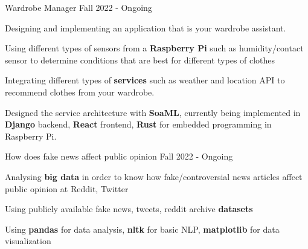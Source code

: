 

\begin{cventries}

  \cventry
    {} %
    {Wardrobe Manager} %
    {} %
    {Fall 2022 - Ongoing} %
    {
      \begin{cvitems} %
        \item {Designing and implementing an application that is your wardrobe assistant.}
        \item {Using different types of sensors from a \textbf{Raspberry Pi} such as humidity/contact sensor to determine conditions that are best for different types of clothes}
        \item {Integrating different types of \textbf{services} such as weather and location API to recommend clothes from your wardrobe.}
        \item {Designed the service architecture with \textbf{SoaML}, currently being implemented in \textbf{Django} backend, \textbf{React} frontend, \textbf{Rust} for embedded programming in Raspberry Pi.}
      \end{cvitems}
    }
  \cventry
    {} %
    {How does fake news affect public opinion} %
    {} %
    {Fall 2022 - Ongoing} %
    {
      \begin{cvitems} %
        \item {Analysing \textbf{big data} in order to know how fake/controversial news articles affect public opinion at Reddit, Twitter}
        \item{Using publicly available fake news, tweets, reddit archive \textbf{datasets}}
        \item {Using \textbf{pandas} for data analysis, \textbf{nltk} for basic NLP, \textbf{matplotlib} for data visualization}
      \end{cvitems}
    }
\end{cventries}